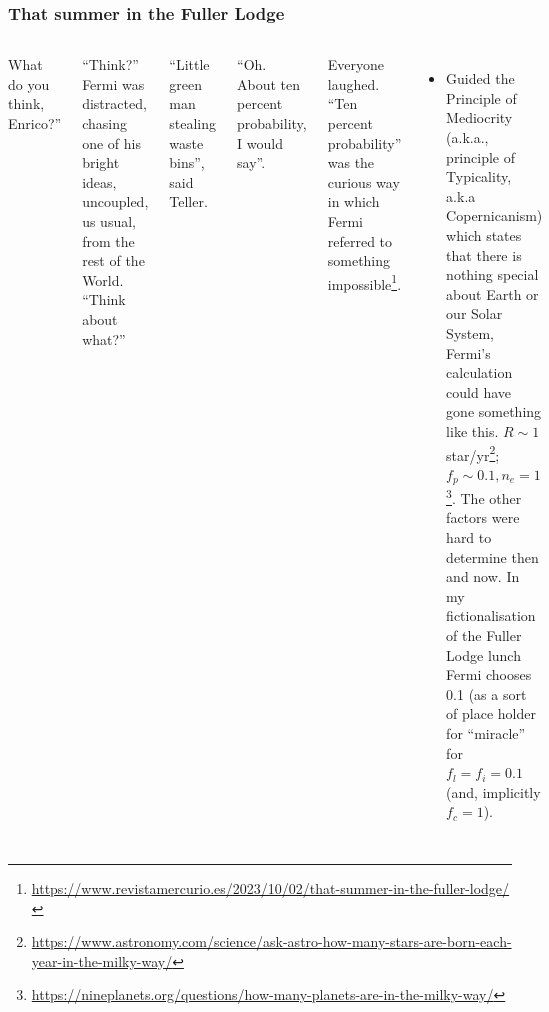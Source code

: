 \begin{frame}
\frametitle{That summer in the Fuller Lodge}

\begin{columns}


What do you think, Enrico?”

“Think?” Fermi was distracted, chasing one of his bright ideas, uncoupled, us usual, from the rest of the World. “Think about what?”

“Little green man stealing waste bins”, said Teller.

“Oh. About ten percent probability, I would say”.

Everyone laughed. “Ten percent probability” was the curious way in which Fermi referred to something impossible\footnote{\url{https://www.revistamercurio.es/2023/10/02/that-summer-in-the-fuller-lodge/}}. 
   

\begin{itemize}

\item Guided the Principle of Mediocrity (a.k.a., principle of Typicality, a.k.a Copernicanism) which states that there is nothing special about Earth or our Solar System, Fermi's calculation could have gone something like this. $R \sim 1$ star/yr\footnote{\url{https://www.astronomy.com/science/ask-astro-how-many-stars-are-born-each-year-in-the-milky-way/}};
$f_p \sim 0.1, n_e=1$ \footnote{\url{https://nineplanets.org/questions/how-many-planets-are-in-the-milky-way/}}. The other factors were hard to determine then and now. In my fictionalisation of the Fuller Lodge lunch Fermi chooses 0.1 (as a sort of place holder for ``miracle'' for $f_l = f_i = 0.1$ (and, implicitly $f_c =1$).
  
\end{itemize}
\end{columns}
\end{frame}


